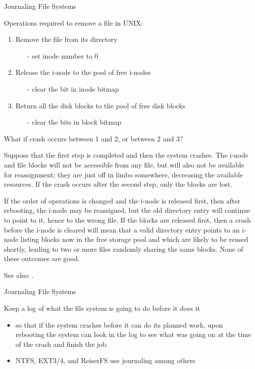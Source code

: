 \begin{frame}{Journaling File Systems}
  \begin{block}{Operations required to remove a file in UNIX:}
    \begin{enumerate}
    \item Remove the file from its directory
      \begin{itemize}
      \item[-] set inode number to 0
      \end{itemize}
    \item Release the i-node to the pool of free i-nodes
      \begin{itemize}
      \item[-] clear the bit in inode bitmap
      \end{itemize}
    \item Return all the disk blocks to the pool of free disk blocks
      \begin{itemize}
      \item[-] clear the bits in block bitmap
      \end{itemize}
    \end{enumerate}
    What if crash occurs between 1 and 2, or between 2 and 3?
  \end{block}
\end{frame}


Suppose that the first step is completed and then the system crashes. The i-node and file
blocks will not be accessible from any file, but will also not be available for
reassignment; they are just off in limbo somewhere, decreasing the available resources. If
the crash occurs after the second step, only the blocks are lost.

If the order of operations is changed and the i-node is released first, then after
rebooting, the i-node may be reassigned, but the old directory entry will continue to
point to it, hence to the wrong file. If the blocks are released first, then a crash
before the i-node is cleared will mean that a valid directory entry points to an i-node
listing blocks now in the free storage pool and which are likely to be reused shortly,
leading to two or more files randomly sharing the same blocks. None of these outcomes are
good.

See also: .

\begin{frame}{Journaling File Systems}
    \begin{block}{Keep a log of what the file system is going to do before it does it}
    \begin{itemize}
    \item so that if the system crashes before it can do its planned work, upon rebooting
      the system can look in the log to see what was going on at the time of the crash and
      finish the job.
    \item NTFS, EXT3/4, and ReiserFS use journaling among others
    \end{itemize}
  \end{block}
\end{frame}

